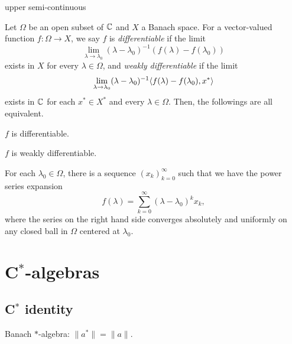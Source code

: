 \documentclass{../../large}
\begin{document}
\begin{prb}
\begin{parts}
\item upper semi-continuous
\end{parts}
\end{prb}

\begin{prb}
Let $\Omega$ be an open subset of $\mathbb{C}$ and $X$ a Banach space.
For a vector-valued function $f:\Omega\to X$, we say $f$ is \emph{differentiable} if the limit
\[\lim_{\lambda\to\lambda_0}(\lambda-\lambda_0)^{-1}(f(\lambda)-f(\lambda_0))\]
exists in $X$ for every $\lambda\in\Omega$, and \emph{weakly differentiable} if the limit
\[\lim_{\lambda\to\lambda_0}(\lambda-\lambda_0)^{-1}\langle f(\lambda)-f(\lambda_0),x^*\rangle\]
exists in $\mathbb{C}$ for each $x^*\in X^*$ and every $\lambda\in\Omega$.
Then, the followings are all equivalent.
\begin{parts}
\item $f$ is differentiable.
\item $f$ is weakly differentiable.
\item For each $\lambda_0\in\Omega$, there is a sequence $(x_k)_{k=0}^\infty$ such that we have the power series expansion
\[f(\lambda)=\sum_{k=0}^\infty(\lambda-\lambda_0)^kx_k,\]
where the series on the right hand side converges absolutely and uniformly on any closed ball in $\Omega$ centered at $\lambda_0$.
\end{parts}
\end{prb}

\begin{prb}
\end{prb}







\chapter{C$^*$-algebras}

\section{C$^*$ identity}
\begin{prb}
Banach $*$-algebra: $\|a^*\|=\|a\|$.
\end{prb}
\end{document}
